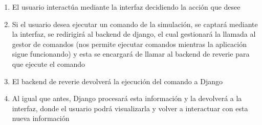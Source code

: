 \begin{enumerate}
	\item El usuario interactúa mediante la interfaz decidiendo la acción que desee
	
	\item Si el usuario desea ejecutar un comando de la simulación, se captará mediante la interfaz, se redirigirá al backend de django, el cual gestionará la llamada al gestor de comandos (nos permite ejecutar comandos mientras la aplicación sigue funcionando) y esta se encargará de llamar al backend de reverie para que ejecute el comando
	
	\item El backend de reverie devolverá la ejecución del comando a Django
	
	\item Al igual que antes, Django procesará esta información y la devolverá a la interfaz, donde el usuario podrá visualizarla y volver a interactuar con esta nueva información
	
\end{enumerate}
